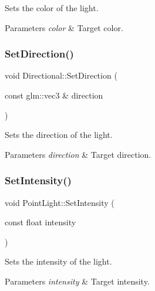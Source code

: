Sets the color of the light. 
\begin{DoxyParams}{Parameters}
{\em color} & Target color. \\
\hline
\end{DoxyParams}
\hypertarget{group___lights_ga497358d0a37e4a87d5e24f286695c0a6}{}\label{group___lights_ga497358d0a37e4a87d5e24f286695c0a6} 
\subsubsection{\texorpdfstring{Set\+Direction()}{SetDirection()}}
{\footnotesize\ttfamily void Directional\+::\+Set\+Direction (\begin{DoxyParamCaption}\item[{const glm\+::vec3 \&}]{direction }\end{DoxyParamCaption})\hspace{0.3cm}{\ttfamily [inline]}}

Sets the direction of the light. 
\begin{DoxyParams}{Parameters}
{\em direction} & Target direction. \\
\hline
\end{DoxyParams}
\hypertarget{group___lights_ga1d97c3f6d636899b719d5014f74b3530}{}\label{group___lights_ga1d97c3f6d636899b719d5014f74b3530} 
\subsubsection{\texorpdfstring{Set\+Intensity()}{SetIntensity()}\hspace{0.1cm}{\footnotesize\ttfamily [1/3]}}
{\footnotesize\ttfamily void Point\+Light\+::\+Set\+Intensity (\begin{DoxyParamCaption}\item[{const float}]{intensity }\end{DoxyParamCaption})\hspace{0.3cm}{\ttfamily [inline]}}

Sets the intensity of the light. 
\begin{DoxyParams}{Parameters}
{\em intensity} & Target intensity. \\
\hline
\end{DoxyParams}
\hypertarget{group___lights_ga5aefcac18f63a3923320e634daff4f57}{}\label{group___lights_ga5aefcac18f63a3923320e634daff4f57} 
